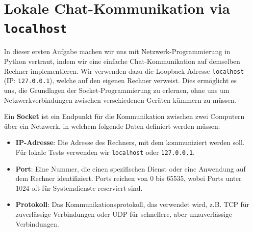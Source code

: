 \section{Lokale Chat-Kommunikation via \texorpdfstring{\texttt{localhost}}{localhost}}

In dieser ersten Aufgabe machen wir uns mit Netzwerk-Programmierung in Python vertraut, indem wir eine einfache Chat-Kommunikation auf demselben Rechner implementieren. Wir verwenden dazu die Loopback-Adresse \texttt{localhost} (\acrshort{IP}: \texttt{127.0.0.1}), welche auf den eigenen Rechner verweist. Dies ermöglicht es uns, die Grundlagen der Socket-Programmierung zu erlernen, ohne uns um Netzwerkverbindungen zwischen verschiedenen Geräten kümmern zu müssen.

Ein \textbf{Socket} ist ein Endpunkt für die Kommunikation zwischen zwei Computern über ein Netzwerk, in welchem folgende Daten definiert werden müssen:
\begin{itemize}
    \item \textbf{\acrshort{IP}-Adresse}: Die Adresse des Rechners, mit dem kommuniziert werden soll. Für lokale Tests verwenden wir \texttt{localhost} oder \texttt{127.0.0.1}.
    \item \textbf{Port}: Eine Nummer, die einen spezifischen Dienst oder eine Anwendung auf dem Rechner identifiziert. Ports reichen von 0 bis 65535, wobei Ports unter 1024 oft für Systemdienste reserviert sind.
    \item \textbf{Protokoll}: Das Kommunikationsprotokoll, das verwendet wird, z.B. \gls{TCP} für zuverlässige Verbindungen oder \gls{UDP} für schnellere, aber unzuverlässige Verbindungen.
\end{itemize}


